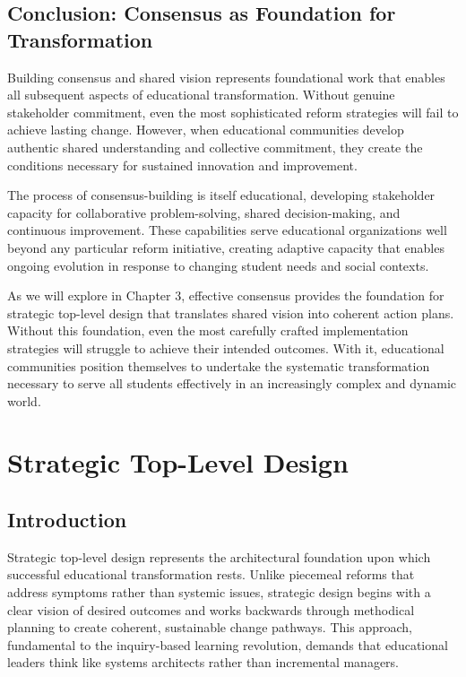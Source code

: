 \documentclass[
  Letterpaper,
]{scrbook}
\begin{document}
\section{Conclusion: Consensus as Foundation for
Transformation}\label{conclusion-consensus-as-foundation-for-transformation}

Building consensus and shared vision represents foundational work that
enables all subsequent aspects of educational transformation. Without
genuine stakeholder commitment, even the most sophisticated reform
strategies will fail to achieve lasting change. However, when
educational communities develop authentic shared understanding and
collective commitment, they create the conditions necessary for
sustained innovation and improvement.

The process of consensus-building is itself educational, developing
stakeholder capacity for collaborative problem-solving, shared
decision-making, and continuous improvement. These capabilities serve
educational organizations well beyond any particular reform initiative,
creating adaptive capacity that enables ongoing evolution in response to
changing student needs and social contexts.

As we will explore in Chapter 3, effective consensus provides the
foundation for strategic top-level design that translates shared vision
into coherent action plans. Without this foundation, even the most
carefully crafted implementation strategies will struggle to achieve
their intended outcomes. With it, educational communities position
themselves to undertake the systematic transformation necessary to serve
all students effectively in an increasingly complex and dynamic world.


\chapter{Strategic Top-Level Design}\label{strategic-top-level-design}

\section{Introduction}\label{introduction-1}

Strategic top-level design represents the architectural foundation upon
which successful educational transformation rests. Unlike piecemeal
reforms that address symptoms rather than systemic issues, strategic
design begins with a clear vision of desired outcomes and works
backwards through methodical planning to create coherent, sustainable
change pathways. This approach, fundamental to the inquiry-based
learning revolution, demands that educational leaders think like systems
architects rather than incremental managers.
\end{document}
